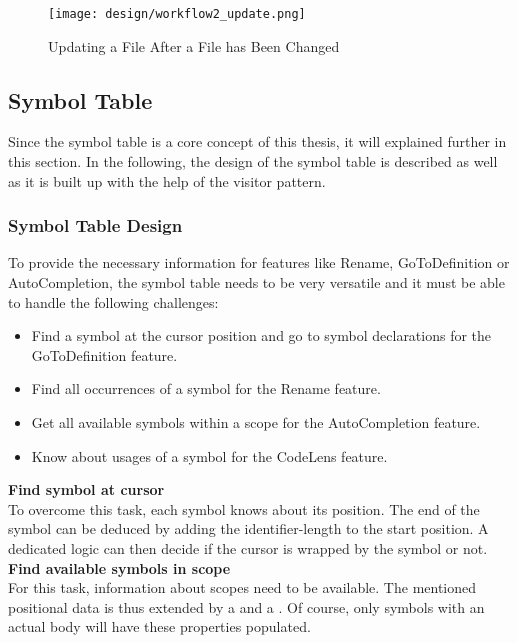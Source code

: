 \begin{figure}[H]
    \centering
    \texttt{[image: design/workflow2\_update.png]}
    \caption{Updating a File After a File has Been Changed}
    \label{fig:workflow2}
\end{figure}


\subsection{Symbol Table}
Since the symbol table is a core concept of this thesis, it will explained further in this section.
In the following, the design of the symbol table is described as well as it is built up with the help of the visitor pattern.

\subsubsection{Symbol Table Design}
To provide the necessary information for features like Rename, GoToDefinition or AutoCompletion,
the symbol table needs to be very versatile and it must be able to handle the following challenges:
\begin{itemize}
    \item Find a symbol at the cursor position and go to symbol declarations for the GoToDefinition feature.
    \item Find all occurrences of a symbol for the Rename feature.
    \item Get all available symbols within a scope for the AutoCompletion feature.
    \item Know about usages of a symbol for the CodeLens feature.
\end{itemize}

\textbf{Find symbol at cursor}\\
To overcome this task, each symbol knows about its position.
The end of the symbol can be deduced by adding the identifier-length to the start position.
A dedicated logic can then decide if the cursor is wrapped by the symbol or not.\\

\textbf{Find available symbols in scope}\\
For this task, information about scopes need to be available.
The mentioned positional data is thus extended by a  and a .
Of course, only symbols with an actual body will have these properties populated.\\

